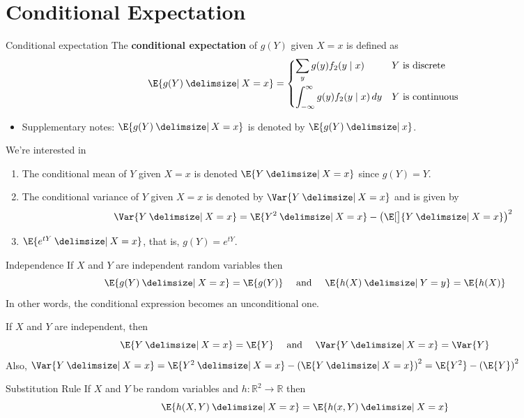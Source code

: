 \section{Conditional Expectation}
\begin{Definition}{Conditional expectation}{}
    The \textbf{conditional expectation} of $ g(Y) $
    given $ X=x $ is defined as
    \[ \E{g(Y)\given X=x}=
        \begin{dcases*}
            \sum_{y}g(y)f_2(y\mid x)                        & $Y$ is discrete   \\
            \int_{-\infty}^{\infty} g(y)f_2(y\mid x)\, d{y} & $Y$ is continuous
        \end{dcases*} \]
\end{Definition}
\begin{Remark}{}{}
    \begin{itemize}
        \item Supplementary notes: $ \E{g(Y)\given X=x} $
              is denoted by $ \E{g(Y)\given x} $.
    \end{itemize}
    We're interested in
    \begin{enumerate}
        \item The conditional mean of $ Y $ given $ X=x $
              is denoted $ \E{Y\given X=x} $ since $ g(Y)=Y $.
        \item The conditional variance of $ Y $ given $ X=x $
              is denoted by $ \Var{Y\given X=x} $ and is given by
              \[ \Var{Y\given X=x}=\E{Y^2\given X=x}-\left( \E[\big]{Y\given X=x} \right)^2 \]
        \item $ \E{e^{tY}\given X=x} $, that is, $ g(Y)=e^{tY} $.
    \end{enumerate}
\end{Remark}
\begin{Theorem}{Independence}{}
    If $ X $ and $ Y $ are independent random variables then
    \[ \E{g(Y)\given X=x}=\E{g(Y)}\quad\text{ and }\quad\E{h(X)\given Y=y}=\E{h(X)} \]
    In other words, the conditional expression becomes an unconditional one.
\end{Theorem}
\begin{Example}{}{}
    If $ X $ and $ Y $ are independent, then
    \[ \E{Y\given X=x}=\E{Y}\quad\text{ and }\quad \Var{Y\given X=x}=\Var{Y} \]
    Also, $ \Var{Y\given X=x}=\E{Y^2\given X=x}-\left( \E{Y\given X=x} \right)^2=
        \E{Y^2}-\left( \E{Y} \right)^2 $
\end{Example}
\begin{Theorem}{Substitution Rule}{}
    If $ X $ and $ Y $
    be random variables and $ h:\mathbb{R}^2\to \mathbb{R} $ then
    \[ \E{h(X,Y)\given X=x}=\E{h(x,Y)\given X=x} \]
\end{Theorem}
